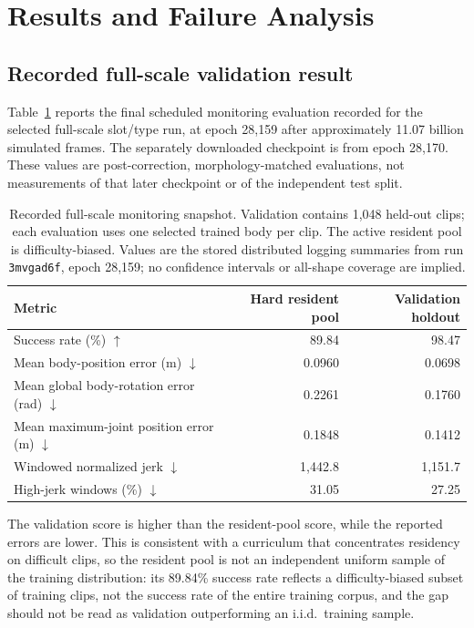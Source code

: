 \section{Results and Failure Analysis}\label{sec:results}

\subsection{Recorded full-scale validation result}\label{sec:full_results}

Table~\ref{tab:full_results} reports the final scheduled monitoring evaluation
recorded for the selected full-scale slot/type run, at epoch 28,159 after
approximately 11.07 billion simulated frames. The separately downloaded
checkpoint is from epoch 28,170. These values are post-correction,
morphology-matched evaluations, not measurements of that later checkpoint
or of the independent test split.

\begin{table}[t]
\centering
\small
\caption{Recorded full-scale monitoring snapshot. Validation contains
1,048 held-out clips; each evaluation uses one selected trained body per clip.
The active resident pool is difficulty-biased. Values are the stored
distributed logging summaries from run \texttt{3mvgad6f}, epoch 28,159;
no confidence intervals or all-shape coverage are implied.}\label{tab:full_results}
\begin{tabular}{lrr}
\toprule
Metric & Hard resident pool & Validation holdout \\
\midrule
Success rate (\%) $\uparrow$ & 89.84 & 98.47 \\
Mean body-position error (m) $\downarrow$ & 0.0960 & 0.0698 \\
Mean global body-rotation error (rad) $\downarrow$ & 0.2261 & 0.1760 \\
Mean maximum-joint position error (m) $\downarrow$ & 0.1848 & 0.1412 \\
Windowed normalized jerk $\downarrow$ & 1,442.8 & 1,151.7 \\
High-jerk windows (\%) $\downarrow$ & 31.05 & 27.25 \\
\bottomrule
\end{tabular}
\end{table}

The validation score is higher than the resident-pool score, while the
reported errors are lower. This is consistent with a curriculum that
concentrates residency on difficult clips, so the resident pool is not an
independent uniform sample of the training distribution: its 89.84\% success
rate reflects a difficulty-biased subset of training clips, not the success
rate of the entire training corpus, and the gap should not be read as
validation outperforming an i.i.d.\ training sample.


